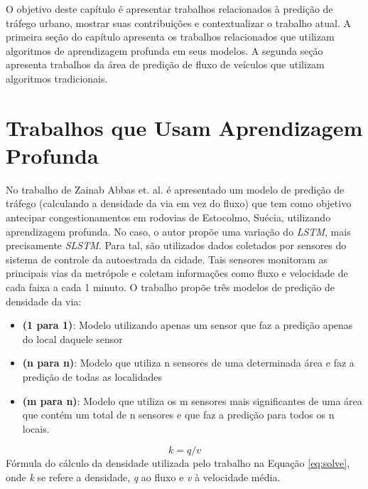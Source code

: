 \label{chapter:trabalhos_relacionados}

O objetivo deste capítulo é apresentar trabalhos relacionados à predição de tráfego urbano, mostrar suas contribuições e contextualizar o trabalho atual. A primeira seção do capítulo apresenta os trabalhos relacionados que utilizam algoritmos de aprendizagem profunda em seus modelos. A segunda seção apresenta trabalhos da área de predição de fluxo de veículos que utilizam algoritmos tradicionais.

\section{Trabalhos que Usam Aprendizagem Profunda}

No trabalho de Zainab Abbas et. al. \cite{Zainab_2018} é apresentado um modelo de predição de tráfego (calculando a densidade da via em vez do fluxo) que tem como objetivo antecipar congestionamentos em rodovias de Estocolmo, Suécia, utilizando aprendizagem profunda. No caso, o autor propõe uma variação do \textit{\acrshort{LSTM}}, mais precisamente \textit{\acrfull{SLSTM}}. Para tal, são utilizados dados coletados por sensores do sistema de controle da autoestrada da cidade. Tais sensores monitoram as principais vias da metrópole e coletam informações como fluxo e velocidade de cada faixa a cada 1 minuto. O trabalho propõe três modelos de predição de densidade da via:

\begin{itemize}
    \item \textbf{(1 para 1)}: Modelo utilizando apenas um sensor que faz a predição apenas do local daquele sensor
    \item \textbf{(n para n)}: Modelo que utiliza n sensores de uma determinada área e faz a predição de todas as localidades
    \item \textbf{(m para n)}: Modelo que utiliza os m sensores mais significantes de uma área que contém um total de n sensores e que faz a predição para todos os n locais.
\end{itemize}

\begin{equation}\label{eq:solve}
k = q / v
\end{equation}
Fórmula do cálculo da densidade utilizada pelo trabalho na Equação \ref{eq:solve}, onde \textit{k} se refere a densidade, \textit{q} ao fluxo e \textit{v} à velocidade média.

